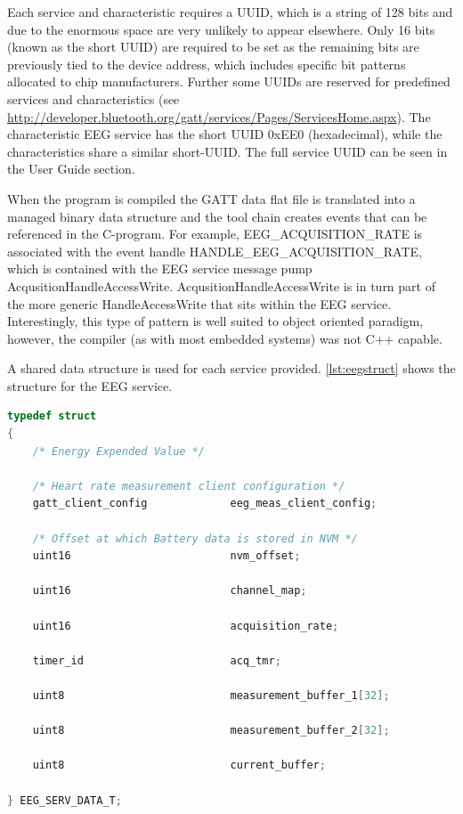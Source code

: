 \documentclass[]{article}
\begin{document}
Each service and characteristic requires a \ac{UUID}, which is a string of 128 bits and due to the enormous space are very unlikely to appear elsewhere. Only 16 bits (known as the short \ac{UUID}) are required to be set as the remaining bits are previously tied to the device address, which includes specific bit patterns allocated to chip manufacturers. Further some \ac{UUID}s are reserved for predefined services and characteristics (see \url{http://developer.bluetooth.org/gatt/services/Pages/ServicesHome.aspx}). The characteristic \ac{EEG} service has the short \ac{UUID} 0xEE0 (hexadecimal), while the characteristics share a similar short-UUID. The full service UUID can be seen in the User Guide section. 

When the program is compiled the GATT data flat file is translated into a managed binary data structure and the tool chain creates events that can be referenced in the C-program. For example, EEG\_ACQUISITION\_RATE is associated with the event handle HANDLE\_EEG\_ACQUISITION\_RATE, which is contained with the EEG service message pump AcqusitionHandleAccessWrite. AcqusitionHandleAccessWrite is in turn part of the more generic HandleAccessWrite that sits within the EEG service. Interestingly, this type of pattern is well suited to object oriented paradigm, however, the compiler (as with most embedded systems) was not C++ capable. 

A shared data structure is used for each service provided. \ref{lst:eegstruct} shows the structure for the \ac{EEG} service. 

\begin{lstlisting}[language=C, caption=\ac{EEG} data structure,label={lst:eegstruct}]
typedef struct
{
    /* Energy Expended Value */

    /* Heart rate measurement client configuration */
    gatt_client_config             eeg_meas_client_config; 

    /* Offset at which Battery data is stored in NVM */
    uint16                         nvm_offset;
    
    uint16                         channel_map; 
    
    uint16                         acquisition_rate;
    
    timer_id                       acq_tmr;
    
    uint8                          measurement_buffer_1[32];
   
    uint8                          measurement_buffer_2[32];
    
    uint8                          current_buffer;

} EEG_SERV_DATA_T;
\end{lstlisting}
\end{document}
